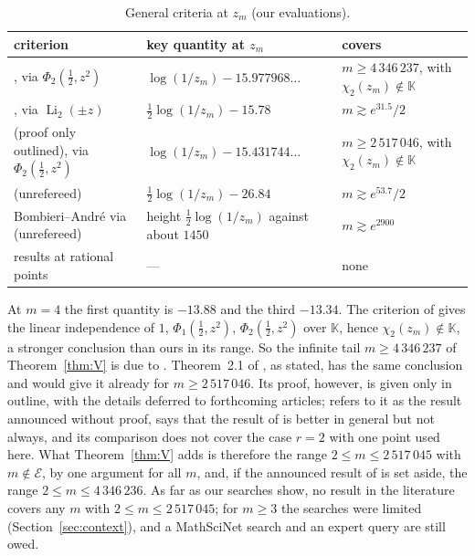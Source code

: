 \documentclass[11pt]{amsart}
\theoremstyle{definition}
\theoremstyle{remark}
\numberwithin{equation}{section}
\newcommand{\KK}{\mathbb{K}}
\newcommand{\cE}{\mathcal{E}}
\newcommand{\Li}{\operatorname{Li}}
\begin{document}
\begin{table}[ht]
\centering\small
\begin{tabular}{@{}>{\raggedright\arraybackslash}p{}>{\raggedright\arraybackslash}p{}>{\raggedright\arraybackslash}p{}@{}}
\toprule
criterion & key quantity at $z_m$ & covers\\
\midrule
\cite[Thm.~1]{DHK2022b}, via $\Phi_2(\frac12,z^2)$ & $\log(1/z_m)-15.977968\ldots$ & $m\ge4\,346\,237$, with $\chi_2(z_m)\notin\KK$\\
\cite[Thm.~1]{DHK2022b}, via $\Li_2(\pm z)$ & $\frac12\log(1/z_m)-15.78$ & $m\gtrsim e^{31.5}/2$\\
\cite[Thm.~2.1]{DHK2020} (proof only outlined), via $\Phi_2(\frac12,z^2)$ & $\log(1/z_m)-15.431744\ldots$ & $m\ge2\,517\,046$, with $\chi_2(z_m)\notin\KK$\\
\cite[Thm.~2.2]{Kawashima2026} (unrefereed) & $\frac12\log(1/z_m)-26.84$ & $m\gtrsim e^{53.7}/2$\\
Bombieri--Andr\'e via \cite{Orr2026} (unrefereed) & height $\frac12\log(1/z_m)$ against about $1450$ & $m\gtrsim e^{2900}$\\
results at rational points & --- & none\\
\bottomrule
\end{tabular}
\caption{General criteria at $z_m$ (our evaluations).}\label{tab:lit}
\end{table}

At $m=4$ the first quantity is $-13.88$ and the third $-13.34$. The criterion of \cite{DHK2022b} gives the linear
independence of $1$, $\Phi_1(\frac12,z^2)$, $\Phi_2(\frac12,z^2)$ over $\KK$, hence $\chi_2(z_m)\notin\KK$, a stronger
conclusion than ours in its range. So the infinite tail $m\ge4\,346\,237$ of Theorem~\ref{thm:V} is due to
\cite{DHK2022b}. Theorem~2.1 of \cite{DHK2020}, as stated, has the same conclusion and would give it already for
$m\ge2\,517\,046$. Its proof, however, is given only in outline, with the details deferred to forthcoming articles;
\cite[Rem.~1(iii)]{DHK2022b} refers to it as the result announced without proof, says that the result of
\cite{DHK2022b} is better in general but not always, and its comparison \cite[Prop.~4]{DHK2022b} does not cover the case
$r=2$ with one point used here. What Theorem~\ref{thm:V} adds is therefore the range $2\le m\le2\,517\,045$ with
$m\notin\cE$, by one argument for all $m$, and, if the announced result of \cite{DHK2020} is set aside, the range
$2\le m\le4\,346\,236$. As far as our searches show, no result in the literature covers any $m$ with
$2\le m\le2\,517\,045$; for $m\ge3$ the searches were limited (Section~\ref{sec:context}), and a MathSciNet search and an
expert query are still owed.
\end{document}

